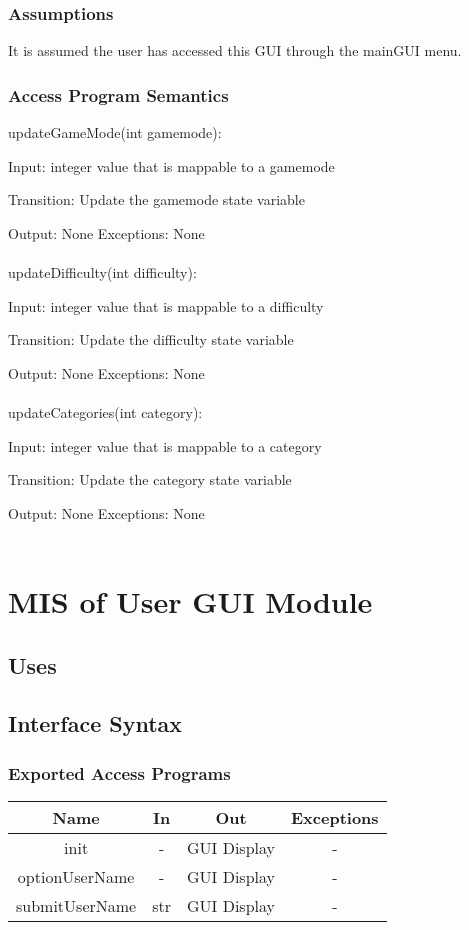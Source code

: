 \documentclass[12,english]{article}
\begin{document}
		\subsubsection{Assumptions}
		It is assumed the user has accessed this GUI through the mainGUI menu. \\
		
		\subsubsection{Access Program Semantics}

		updateGameMode(int gamemode):
		
		Input: integer value that is mappable to a gamemode
		
		Transition: Update the gamemode state variable

		Output: None
		Exceptions: None\\
		\\
		updateDifficulty(int difficulty):
		
		Input: integer value that is mappable to a difficulty
		
		Transition: Update the difficulty state variable

		Output: None
		Exceptions: None\\
		\\
		updateCategories(int category):
		
		Input: integer value that is mappable to a category
		
		Transition: Update the category state variable

		Output: None 
		Exceptions: None\\
		\\
		

		
\section{MIS of User GUI Module}
\subsection{Uses}
		\subsection{Interface Syntax}
		\subsubsection{Exported Access Programs}
		\begin{tabular}[pos]{|c|c|c|c|}
			
			\hline
			\textbf{Name}& \textbf{In} & \textbf{Out} & \textbf{Exceptions} \\ \hline
			init & - & GUI Display & -\\ \hline
			optionUserName & - & GUI Display & - \\ \hline
			submitUserName & str & GUI Display & - \\ \hline
			
			
		\end{tabular}
		
\end{document}
